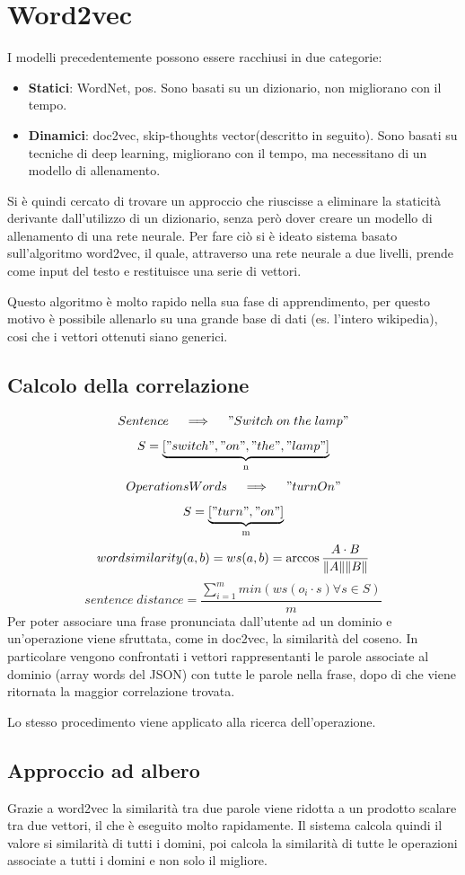 \documentclass[twoside]{supsistudent}
\begin{document}
\section{Word2vec}
I modelli precedentemente possono essere racchiusi in due categorie:
\begin{itemize}
  \item \textbf{Statici}: WordNet, pos. Sono basati su un dizionario, non migliorano con il tempo.
  \item \textbf{Dinamici}: doc2vec, skip-thoughts vector(descritto in seguito). Sono basati su tecniche di deep learning, migliorano con il tempo, ma necessitano di un modello di allenamento.
\end{itemize}
Si è quindi cercato di trovare un approccio che riuscisse a eliminare la staticità derivante dall'utilizzo di un dizionario, senza però dover creare un modello di allenamento di una rete neurale.
Per fare ciò si è ideato sistema basato sull'algoritmo word2vec, il quale, attraverso una rete neurale a due livelli, prende come input del testo e restituisce una serie di vettori. 

Questo algoritmo è molto rapido nella sua fase di apprendimento, per questo motivo è possibile allenarlo su una grande base di dati (es. l'intero wikipedia), cosi che i vettori ottenuti siano generici.\cite{word2vec}
\subsection{Calcolo della correlazione}
 \[
 Sentence \quad\implies\quad "Switch\;on\;the\;lamp"
 \]
 \[
 S = 
\underbrace{["switch","on","the","lamp"]}_\text{n}
\]
 \[
 OperationsWords \quad\implies\quad "turnOn"
 \]
 \[
 S = 
\underbrace{["turn","on"]}_\text{m}
\]
 \[
 word similarity (a,b)= ws(a,b) = \arccos{{A \cdot B \over \|A\| \|B\|}}  
\]
 \[
 sentence\;distance = \frac{\sum_{i=1}^{m} min(ws(o_i \cdot s)\forall s \in S)} {m}
 \]
Per poter associare una frase pronunciata dall'utente ad un dominio e un'operazione viene sfruttata, come in doc2vec, la similarità del coseno. In particolare vengono confrontati i vettori rappresentanti le parole associate al dominio (array words del JSON) con tutte le parole nella frase, dopo di che viene ritornata la maggior correlazione trovata.

Lo stesso procedimento viene applicato alla ricerca dell'operazione. 

\subsection{Approccio ad albero}
Grazie a word2vec la similarità tra due parole viene ridotta a un prodotto scalare tra due vettori, il che è eseguito molto rapidamente. Il sistema calcola quindi il valore si similarità di tutti i domini, poi calcola la similarità di tutte le operazioni associate a tutti i domini e non solo il migliore. 
\end{document}

